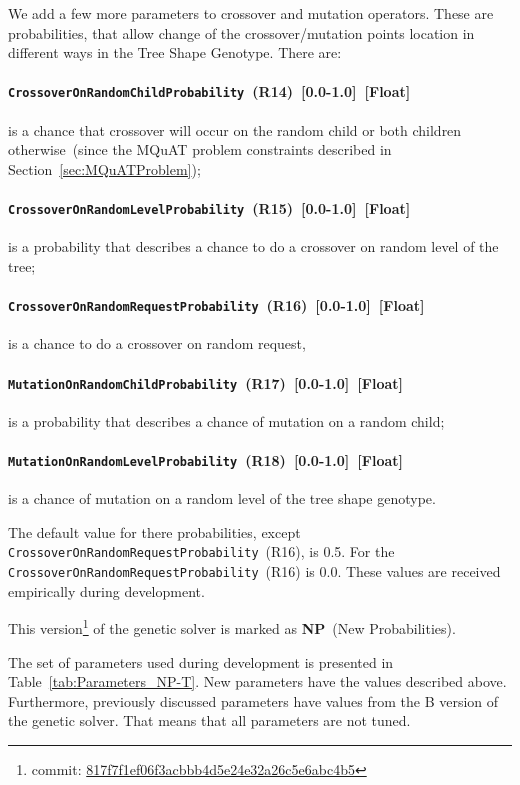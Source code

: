 We add a few more parameters to crossover and mutation operators. These are probabilities, that allow change of the crossover/mutation points location in different ways in the Tree Shape Genotype.
There are:
\paragraph{\texttt{CrossoverOnRandomChildProbability}~(R14)~[0.0-1.0]~[Float]} is a chance that crossover will occur on the random child or both children otherwise~(since the MQuAT problem constraints described in Section~\ref{sec:MQuATProblem});
\paragraph{\texttt{CrossoverOnRandomLevelProbability}~(R15)~[0.0-1.0]~[Float]} is a probability that describes a chance to do a crossover on random level of the tree;
\paragraph{\texttt{CrossoverOnRandomRequestProbability}~(R16)~[0.0-1.0]~[Float]} is a chance to do a crossover on random request,
\paragraph{\texttt{MutationOnRandomChildProbability}~(R17)~[0.0-1.0]~[Float]} is a probability that describes a chance of mutation on a random child;
\paragraph{\texttt{MutationOnRandomLevelProbability}~(R18)~[0.0-1.0]~[Float]} is a chance of mutation on a random level of the tree shape genotype.

The default value for there probabilities, except \texttt{Cross\-ov\-er\-On\-Ran\-dom\-Re\-qu\-est\-Pro\-ba\-bi\-li\-ty}~(R16), is 0.5. For the \texttt{CrossoverOnRandomRequestProbability}~(R16) is 0.0. These values are received empirically during development.

This version\footnote{commit: \href{https://git-st.inf.tu-dresden.de/mquat/mquat2/commit/817f7f1ef06f3acbbb4d5e24e32a26c5e6abc4b5}{817f7f1ef06f3acbbb4d5e24e32a26c5e6abc4b5}} of the genetic solver is marked as \textbf{NP}~(New Probabilities).

The set of parameters used during development is presented in Table~\ref{tab:Parameters_NP-T}. New parameters have the values described above. Furthermore, previously discussed parameters have values from the B version of the genetic solver. That means that all parameters are not tuned.

